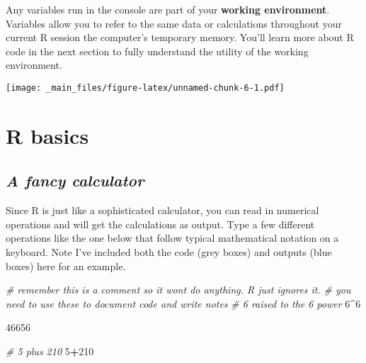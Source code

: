 \documentclass[
]{book}
\newenvironment{Shaded}{\begin{snugshade}}{\end{snugshade}}
\newcommand{\CommentTok}[1]{\textcolor[rgb]{0.56,0.35,0.01}{\textit{#1}}}
\newcommand{\DecValTok}[1]{\textcolor[rgb]{0.00,0.00,0.81}{#1}}
\newcommand{\NormalTok}[1]{#1}
\newcommand{\SpecialCharTok}[1]{\textcolor[rgb]{0.81,0.36,0.00}{\textbf{#1}}}
\theoremstyle{definition}
\theoremstyle{definition}
\theoremstyle{definition}
\theoremstyle{definition}
\theoremstyle{remark}
\begin{document}
Any variables run in the console are part of your \textbf{working environment}. Variables allow you to refer to the same data or calculations throughout your current R session the computer's temporary memory. You'll learn more about R code in the next section to fully understand the utility of the working environment.

\texttt{[image: \_main\_files/figure-latex/unnamed-chunk-6-1.pdf]}

\hypertarget{r-basics}{%
\section{R basics}\label{r-basics}}

\hypertarget{a-fancy-calculator}{%
\subsection{\texorpdfstring{\emph{A fancy calculator}}{A fancy calculator}}\label{a-fancy-calculator}}

Since R is just like a sophisticated calculator, you can read in numerical operations and will get the calculations as output. Type a few different operations like the one below that follow typical mathematical notation on a keyboard. Note I've included both the code (grey boxes) and outputs (blue boxes) here for an example.

\begin{Shaded}
\begin{Highlighting}[]
\CommentTok{\# remember this is a comment so it won\textquotesingle{}t do anything. R just ignores it.}
\CommentTok{\# you need to use these to document code and write notes}
\CommentTok{\# 6 raised to the 6 power}
\DecValTok{6}\SpecialCharTok{\^{}}\DecValTok{6}
\end{Highlighting}
\end{Shaded}

\begin{Shaded}
\begin{Highlighting}[]
\NormalTok{[1] 46656}
\end{Highlighting}
\end{Shaded}

\begin{Shaded}
\begin{Highlighting}[]
\CommentTok{\# 5 plus 210}
\DecValTok{5}\SpecialCharTok{+}\DecValTok{210}
\end{Highlighting}
\end{Shaded}
\end{document}
